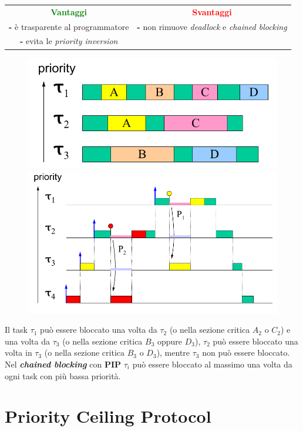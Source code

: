 \begin{center}
    \begin{tabular}{ c | c }
        \textcolor{green}{\textbf{Vantaggi}} & \textcolor{red}{\textbf{Svantaggi}} \\
        \textbf{-} è trasparente al programmatore & \textbf{-} non rimuove \textit{deadlock} e \textit{chained blocking} \\
        \textbf{-} evita le \textit{priority inversion} &  \\
    \end{tabular}
\end{center}
\begin{figure}[h]
    \centering
    \begin{minipage}[t]{0.45\textwidth}
        \centering
        \includegraphics[width=\textwidth]{img/pip_2}
    \end{minipage}
    \begin{minipage}[t]{0.45\textwidth}
        \centering
        \includegraphics[width=\textwidth]{img/pip_3}
    \end{minipage}
\end{figure}
Il task $\tau_1$ può essere bloccato una volta da $\tau_2$ (o nella sezione critica $A_2$ o $C_2$) e una volta da $\tau_3$ (o nella sezione critica $B_3$ oppure $D_3$), $\tau_2$ può essere bloccato una volta in $\tau_3$ (o nella sezione critica $B_3$ o $D_3$), mentre $\tau_3$ non può essere bloccato. \\
Nel \textbf{\textit{chained blocking}} con \textbf{PIP} $\tau_i$ può essere bloccato al massimo una volta da ogni task con più bassa priorità.

\section{Priority Ceiling Protocol}